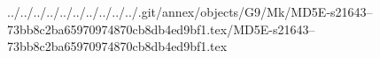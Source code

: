 ../../../../../../../../../../.git/annex/objects/G9/Mk/MD5E-s21643--73bb8c2ba65970974870cb8db4ed9bf1.tex/MD5E-s21643--73bb8c2ba65970974870cb8db4ed9bf1.tex